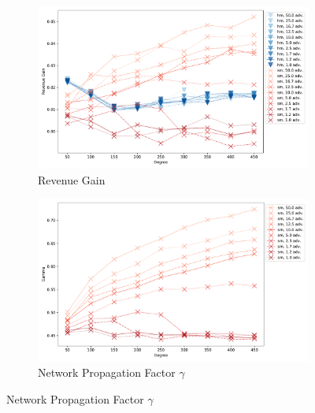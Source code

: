 \begin{figure}[tbp]
	 \begin{subfigure}[b]{\textwidth}
		\includegraphics[width=\textwidth]{figures/sm_edge_new_revenue.pdf}
		\caption{Revenue Gain}
		\label{fig:sm_edge_rev}
	\end{subfigure}
	\hfill
	\begin{subfigure}[b]{\textwidth}
		\includegraphics[width=\textwidth]{figures/sm_edge_new_gamma.pdf}
		\caption{Network Propagation Factor $\gamma$}
		\label{fig:sm_edge_gamma}
	\end{subfigure}
\end{figure}

